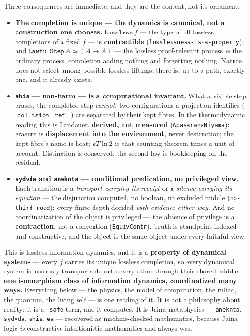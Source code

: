 \documentclass[11pt]{article}
\newcommand{\tm}[1]{\texttt{#1}}
\begin{document}
Three consequences are immediate, and they are the content, not its ornament:

\begin{itemize}
  \item \textbf{The completion is unique --- the dynamics is canonical, not a
  construction one chooses.} $\tm{Lossless}\,f$ --- the type of all lossless
  completions of a fixed $f$ --- is \textbf{contractible}
  (\tm{losslessness-is-a-property}); and $\tm{LawfulStep}\,A \simeq (A \to A)$
  --- the lossless proof-relevant process \emph{is} the ordinary process,
  completion adding nothing and forgetting nothing. Nature does not select among
  possible lossless liftings; there is, up to a path, exactly one, and it
  already exists.

  \item \textbf{\tm{ahis} --- non-harm --- is a computational invariant.} What
  a visible step erases, the completed step \emph{cannot}: two configurations a
  projection identifies ($\tm{collision} = \tm{refl}$) are separated by their
  kept fibres. In the thermodynamic reading this is Landauer, \textbf{derived,
  not measured} (\tm{ApasaranaNiyama}): erasure is \textbf{displacement into the
  environment}, never destruction; the kept fibre's name is heat; $kT\ln 2$ is
  that counting theorem times a unit of account. Distinction is conserved; the
  second law is bookkeeping on the residual.

  \item \textbf{\tm{sydvda} and \tm{aneknta} --- conditional predication, no
  privileged view.} Each transition is a \emph{transport carrying its receipt}
  or a \emph{silence carrying its equation} --- the disjunction computed, no
  boolean, no excluded middle (\tm{no-third-road}); every finite depth decided
  \emph{with evidence either way}. And no coordinatization of the object is
  privileged --- the absence of privilege is a \textbf{contraction}, not a
  convention (\tm{EquivContr}). Truth is standpoint-indexed and constructive,
  and the object is the same object under every faithful view.
\end{itemize}

This is lossless information dynamics, and it is a \textbf{property of dynamical
systems} --- every $f$ carries its unique lossless completion, so every
dynamical system is losslessly transportable onto every other through their
shared middle: \textbf{one isomorphism class of information dynamics,
coordinatized many ways.} Everything below --- the physics, the model of
computation, the ruliad, the quantum, the living self --- is one reading of it.
It is not a philosophy about reality; it is a \tm{--safe} term, and it computes.
It is Jaina metaphysics --- \tm{aneknta}, \tm{sydvda}, \tm{ahis},
\tm{ea} --- recovered as machine-checked mathematics, because Jaina logic
\emph{is} constructive intuitionistic mathematics and always was.
\end{document}
